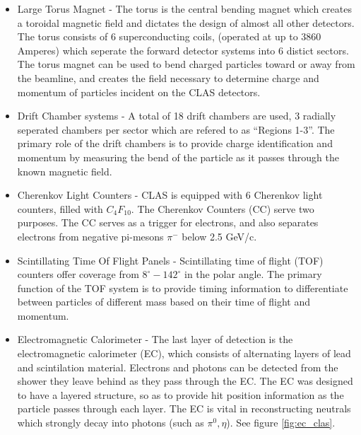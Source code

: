 \begin{itemize}
\item Large Torus Magnet - The torus is the central bending magnet which creates a toroidal magnetic field and dictates the design of almost all other detectors.  The torus consists of 6 superconducting coils, (operated at up to 3860 Amperes) which seperate the forward detector systems into 6 distict sectors.  The torus magnet can be used to bend charged particles toward or away from the beamline, and creates the field necessary to determine charge and momentum of particles incident on the CLAS detectors.  
\item Drift Chamber systems - A total of 18 drift chambers are used, 3 radially seperated chambers per sector which are refered to as ``Regions 1-3''.  The primary role of the drift chambers is to provide charge identification and momentum by measuring the bend of the particle as it passes through the known magnetic field.    
\item Cherenkov Light Counters - CLAS is equipped with 6 Cherenkov light counters, filled with $C_{4} F_{10}$.  The Cherenkov Counters (CC) serve two purposes.  The CC serves as a trigger for electrons, and also separates electrons from negative pi-mesons $\pi^{-}$ below 2.5 GeV/c.
\item Scintillating Time Of Flight Panels - Scintillating time of flight (TOF) counters offer coverage from $8^{\circ} - 142^{\circ}$ in the polar angle.  The primary function of the TOF system is to provide timing information to differentiate between particles of different mass based on their time of flight and momentum.  
\item Electromagnetic Calorimeter - The last layer of detection is the electromagnetic calorimeter (EC), which consists of alternating layers of lead and scintilation material.  Electrons and photons can be detected from the shower they leave behind as they pass through the EC.  The EC was designed to have a layered structure, so as to provide hit position information as the particle passes through each layer.  The EC is vital in reconstructing neutrals which strongly decay into photons (such as $\pi^0, \eta$). See figure \ref{fig:ec_clas}.  
\end{itemize}

